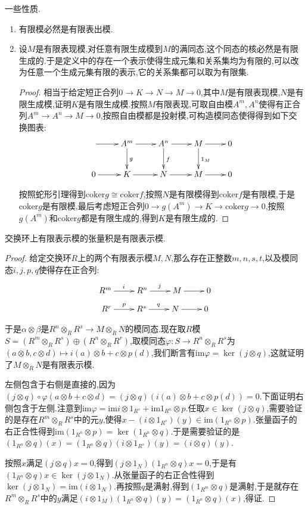 一些性质.
\begin{enumerate}
	\item 有限模必然是有限表出模.
	\item 设$M$是有限表现模,对任意有限生成模到$M$的满同态,这个同态的核必然是有限生成的.于是定义中的存在一个表示使得生成元集和关系集均为有限的,可以改为任意一个生成元集有限的表示,它的关系集都可以取为有限集.
	\begin{proof}
		
		相当于给定短正合列$0\to K\to N\to M\to0$,其中$M$是有限表现模,$N$是有限生成模,证明$K$是有限生成模.按照$M$有限表现,可取自由模$A^m,A^n$使得有正合列$A^m\to A^n\to M\to0$,按照自由模都是投射模,可构造模同态使得得到如下交换图表:
		$$\xymatrix{
			\ar[r]&A^m\ar[r]\ar[d]^g&A^n\ar[r]\ar[d]^f&M\ar[r]\ar[d]^{1_M}&0\\
			0\ar[r]&K\ar[r]&N\ar[r]&M\ar[r]&0}$$
		
		按照蛇形引理得到$\mathrm{coker}g\cong\mathrm{coker}f$,按照$N$是有限模得到$\mathrm{coker}f$是有限模,于是$\mathrm{coker}g$是有限模,最后考虑短正合列$0\to g(A^m)\to K\to\mathrm{coker}g\to0$,按照$g(A^m)$和$\mathrm{coker}g$都是有限生成的,得到$K$是有限生成的.
	\end{proof}
\end{enumerate}

交换环上有限表示模的张量积是有限表示模.
\begin{proof}
	
	给定交换环$R$上的两个有限表示模$M,N$,那么存在正整数$m,n,s,t$,以及模同态$i,j,p,q$使得存在正合列:
	$$\xymatrix{R^m\ar[r]^i&R^n\ar[r]^j&M\ar[r]&0}$$
	$$\xymatrix{R^r\ar[r]^p&R^s\ar[r]^q&N\ar[r]&0}$$
	
	于是$\alpha\otimes\beta$是$R^n\otimes_RR^s\to M\otimes_RN$的模同态.现在取$R$模$S=(R^m\otimes_RR^s)\oplus(R^n\otimes_RR^r)$,取模同态$\varphi:S\to R^n\otimes_RR^s$为$(a\otimes b,c\otimes d)\mapsto i(a)\otimes b+c\otimes p(d)$,我们断言有$\mathrm{im}\varphi=\ker(j\otimes q)$,这就证明了$M\otimes_RN$是有限表示模.
	
	左侧包含于右侧是直接的,因为$(j\otimes q)\circ\varphi(a\otimes b+c\otimes d)=(j\otimes q)(i(a)\otimes b+c\otimes p(d))=0$.下面证明右侧包含于左侧.注意到$\mathrm{im}\varphi=\mathrm{im}i\otimes 1_{R^s}+\mathrm{im}1_{R^n}\otimes p$.任取$x\in\ker(j\otimes q)$,需要验证的是存在$R^m\otimes_R R^s$中的元$y$,使得$x-(i\otimes 1_{R^s})(y)\in\mathrm{im}(1_{R^n}\otimes p)$.张量函子的右正合性得到$\mathrm{im}(1_{R^n}\otimes p)=\ker(1_{R^n}\otimes q)$.于是需要验证的是$(1_{R^n}\otimes q)(x)=(1_{R^n}\otimes q)(i\otimes 1_{R^s})(y)=(i\otimes q)(y)$.
	
	按照$x$满足$(j\otimes q)x=0$,得到$(j\otimes 1_N)(1_{R^n}\otimes q)x=0$,于是有$(1_{R^n}\otimes q)x\in\ker(j\otimes 1_N)$.从张量函子的右正合性得到$\ker(j\otimes 1_N)=\mathrm{im}(i\otimes 1_N)$.再按照$q$是满射,得到$(1_{R^m}\otimes q)$是满射,于是就存在$R^m\otimes_RR^s$中的$y$满足$(i\otimes1_M)(1_{R^n}\otimes q)(y)=(1_{R^n}\otimes q)(x)$,得证.	
\end{proof}

